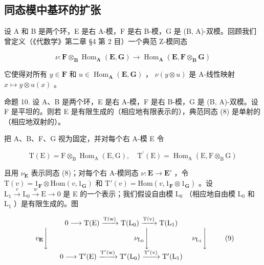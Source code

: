 \subsection{同态模中基环的扩张}

设 A 和 B 是两个环，E 是右 A-模，F 是右 B-模，G 是 (B, A)-双模。回顾我们曾定义（《代数学》第二章 §4 第 2 目）一个典范 Z-模同态

\[
\nu \colon \mathbf {F} \otimes_ {\mathbf {B}} \operatorname{Hom} _ {\mathbf {A}} (\mathbf {E}, \mathbf {G}) \rightarrow \operatorname{Hom} _ {\mathbf {A}} (\mathbf {E}, \mathbf {F} \otimes_ {\mathbf {B}} \mathbf {G})\tag{8}
\]

它使得对所有 \(y \in \mathbf{F}\) 和 \(u \in \operatorname{Hom}_{\mathbf{A}}(\mathbf{E}, \mathbf{G})\) ， \(\nu(y \otimes u)\) 是 A-线性映射 \(x \mapsto y \otimes u(x)\) 。

命题 10. 设 A、B 是两个环，E 是右 A-模，F 是右 B-模，G 是 (B, A)-双模。设 F 是平坦的。则若 E 是有限生成的（相应地有限表示的），典范同态 (8) 是单射的（相应地双射的）。

把 A、B、F、G 视为固定，并对每个右 A-模 E 令

\[
\mathrm{T} (\mathrm{E}) = \mathrm{F} \otimes_ {\mathrm{B}} \operatorname{Hom} _ {\mathrm{A}} (\mathrm{E}, \mathrm{G}), \quad \mathrm{T} ^ {\prime} (\mathrm{E}) = \operatorname{Hom} _ {\mathrm{A}} (\mathrm{E}, \mathrm{F} \otimes_ {\mathrm{B}} \mathrm{G})
\]

且用 \(\nu_{\mathbf{E}}\) 表示同态 (8)；对每个右 A-模同态 \(\nu: \mathbf{E} \to \mathbf{E}'\) ，令 \(\mathrm{T}(v) = 1_{\mathbf{F}} \otimes \mathrm{Hom}(v, 1_{\mathbf{G}})\) 和 \(\mathrm{T}'(v) = \mathrm{Hom}(v, 1_{\mathbf{F}} \otimes 1_{\mathbf{G}})\) 。设 \(\mathrm{L}_1 \xrightarrow{v} \mathrm{L}_0 \xrightarrow{w} \mathrm{E} \to 0\) 是 E 的一个表示；我们假设自由模 \(\mathrm{L}_0\) （相应地自由模 \(\mathrm{L}_0\) 和 \(\mathrm{L}_1\) ）是有限生成的。图

\[
\begin{array}{c} 0 \longrightarrow \mathrm{T(E)} \xrightarrow {\mathrm{T(w)}} \mathrm {T(L_ {0})} \xrightarrow {\mathrm{T(v)}} \mathrm {T(L_ {1})} \\ v _ {\mathbf {E}} \Biggl \downarrow \qquad \qquad \qquad \qquad \qquad \qquad \nu_ {\mathrm {L_ {0}}} \Biggl \downarrow \qquad \qquad \qquad \nu_ {\mathrm {L_ {1}}} \Biggl \downarrow \\ 0 \longrightarrow \mathrm {T^ {\prime} (E)} \xrightarrow {\mathrm {T^ {\prime} (w)}} \mathrm {T^ {\prime} (L_ {0})} \xrightarrow {\mathrm {T^ {\prime} (v)}} \mathrm {T^ {\prime} (L_ {1})} \end{array}\tag{9}
\]

